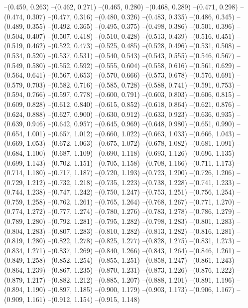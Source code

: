 --(0.459, 0.263)
--(0.462, 0.271)
--(0.465, 0.280)
--(0.468, 0.289)
--(0.471, 0.298)
--(0.474, 0.307)
--(0.477, 0.316)
--(0.480, 0.326)
--(0.483, 0.335)
--(0.486, 0.345)
--(0.489, 0.355)
--(0.492, 0.365)
--(0.495, 0.375)
--(0.498, 0.386)
--(0.501, 0.396)
--(0.504, 0.407)
--(0.507, 0.418)
--(0.510, 0.428)
--(0.513, 0.439)
--(0.516, 0.451)
--(0.519, 0.462)
--(0.522, 0.473)
--(0.525, 0.485)
--(0.528, 0.496)
--(0.531, 0.508)
--(0.534, 0.520)
--(0.537, 0.531)
--(0.540, 0.543)
--(0.543, 0.555)
--(0.546, 0.567)
--(0.549, 0.580)
--(0.552, 0.592)
--(0.555, 0.604)
--(0.558, 0.616)
--(0.561, 0.629)
--(0.564, 0.641)
--(0.567, 0.653)
--(0.570, 0.666)
--(0.573, 0.678)
--(0.576, 0.691)
--(0.579, 0.703)
--(0.582, 0.716)
--(0.585, 0.728)
--(0.588, 0.741)
--(0.591, 0.753)
--(0.594, 0.766)
--(0.597, 0.778)
--(0.600, 0.791)
--(0.603, 0.803)
--(0.606, 0.815)
--(0.609, 0.828)
--(0.612, 0.840)
--(0.615, 0.852)
--(0.618, 0.864)
--(0.621, 0.876)
--(0.624, 0.888)
--(0.627, 0.900)
--(0.630, 0.912)
--(0.633, 0.923)
--(0.636, 0.935)
--(0.639, 0.946)
--(0.642, 0.957)
--(0.645, 0.969)
--(0.648, 0.980)
--(0.651, 0.990)
--(0.654, 1.001)
--(0.657, 1.012)
--(0.660, 1.022)
--(0.663, 1.033)
--(0.666, 1.043)
--(0.669, 1.053)
--(0.672, 1.063)
--(0.675, 1.072)
--(0.678, 1.082)
--(0.681, 1.091)
--(0.684, 1.100)
--(0.687, 1.109)
--(0.690, 1.118)
--(0.693, 1.126)
--(0.696, 1.135)
--(0.699, 1.143)
--(0.702, 1.151)
--(0.705, 1.158)
--(0.708, 1.166)
--(0.711, 1.173)
--(0.714, 1.180)
--(0.717, 1.187)
--(0.720, 1.193)
--(0.723, 1.200)
--(0.726, 1.206)
--(0.729, 1.212)
--(0.732, 1.218)
--(0.735, 1.223)
--(0.738, 1.228)
--(0.741, 1.233)
--(0.744, 1.238)
--(0.747, 1.242)
--(0.750, 1.247)
--(0.753, 1.251)
--(0.756, 1.254)
--(0.759, 1.258)
--(0.762, 1.261)
--(0.765, 1.264)
--(0.768, 1.267)
--(0.771, 1.270)
--(0.774, 1.272)
--(0.777, 1.274)
--(0.780, 1.276)
--(0.783, 1.278)
--(0.786, 1.279)
--(0.789, 1.280)
--(0.792, 1.281)
--(0.795, 1.282)
--(0.798, 1.283)
--(0.801, 1.283)
--(0.804, 1.283)
--(0.807, 1.283)
--(0.810, 1.282)
--(0.813, 1.282)
--(0.816, 1.281)
--(0.819, 1.280)
--(0.822, 1.278)
--(0.825, 1.277)
--(0.828, 1.275)
--(0.831, 1.273)
--(0.834, 1.271)
--(0.837, 1.269)
--(0.840, 1.266)
--(0.843, 1.264)
--(0.846, 1.261)
--(0.849, 1.258)
--(0.852, 1.254)
--(0.855, 1.251)
--(0.858, 1.247)
--(0.861, 1.243)
--(0.864, 1.239)
--(0.867, 1.235)
--(0.870, 1.231)
--(0.873, 1.226)
--(0.876, 1.222)
--(0.879, 1.217)
--(0.882, 1.212)
--(0.885, 1.207)
--(0.888, 1.201)
--(0.891, 1.196)
--(0.894, 1.190)
--(0.897, 1.185)
--(0.900, 1.179)
--(0.903, 1.173)
--(0.906, 1.167)
--(0.909, 1.161)
--(0.912, 1.154)
--(0.915, 1.148)
